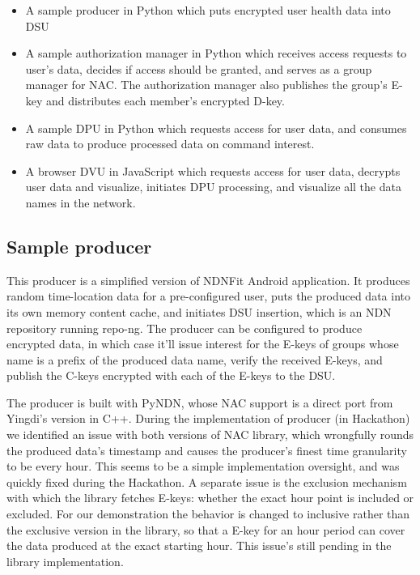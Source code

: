 \documentclass[letterpaper,twocolumn,11pt]{article}
\begin{document}
\begin{itemize}
\item A sample producer in Python which puts encrypted user health data into DSU
\item A sample authorization manager in Python which receives access requests to user's data, decides if access should be granted, and serves as a group manager for NAC. The authorization manager also publishes the group's E-key and distributes each member's encrypted D-key.
\item A sample DPU in Python which requests access for user data, and consumes raw data to produce processed data on command interest.
\item A browser DVU in JavaScript which requests access for user data, decrypts user data and visualize, initiates DPU processing, and visualize all the data names in the network.
\end{itemize}

\subsection{Sample producer}

This producer is a simplified version of NDNFit Android application. It produces random time-location data for a pre-configured user, puts the produced data into its own memory content cache, and initiates DSU insertion, which is an NDN repository running repo-ng. The producer can be configured to produce encrypted data, in which case it'll issue interest for the E-keys of groups whose name is a prefix of the produced data name, verify the received E-keys, and publish the C-keys encrypted with each of the E-keys to the DSU.

The producer is built with PyNDN, whose NAC support is a direct port from Yingdi's version in C++. During the implementation of producer (in Hackathon) we identified an issue with both versions of NAC library, which wrongfully rounds the produced data's timestamp and causes the producer's finest time granularity to be every hour. This seems to be a simple implementation oversight, and was quickly fixed during the Hackathon. A separate issue is the exclusion mechanism with which the library fetches E-keys: whether the exact hour point is included or excluded. For our demonstration the behavior is changed to inclusive rather than the exclusive version in the library, so that a E-key for an hour period can cover the data produced at the exact starting hour. This issue's still pending in the library implementation.
\end{document}
